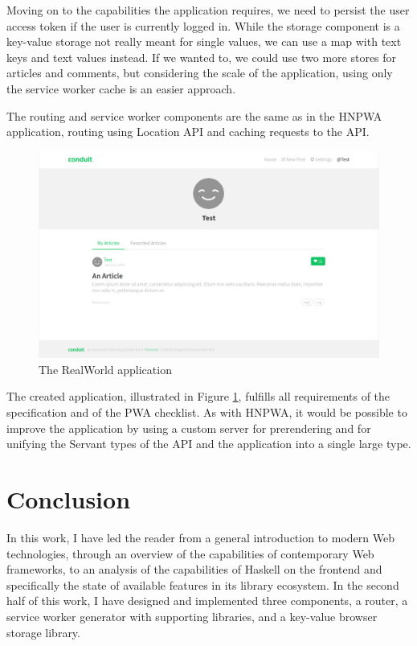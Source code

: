 \documentclass[english,zadani,odsaz]{fitthesis}
\begin{document}
Moving on to the capabilities the application requires, we need to persist the
user access token if the user is currently logged in. While the storage
component is a key-value storage not really meant for single values, we can use
a map with text keys and text values instead. If we wanted to, we could use two
more stores for articles and comments, but considering the scale of the
application, using only the service worker cache is an easier approach.

The routing and service worker components are the same as in the HNPWA
application, routing using Location API and caching requests to the API.

\begin{figure}[p]
\centering
\includegraphics[width=.9\linewidth]{obrazky-figures/screenshot-realworld.png}
\caption{The RealWorld application \label{realworld-app}}
\end{figure}

The created application, illustrated in Figure \ref{realworld-app}, fulfills all
requirements of the specification and of the PWA checklist. As with HNPWA, it
would be possible to improve the application by using a custom server for
prerendering and for unifying the Servant types of the API and the application
into a single large type.

\chapter{Conclusion}
\label{sec:org76fbcfd}
In this work, I have led the reader from a general introduction to modern Web
technologies, through an overview of the capabilities of contemporary Web
frameworks, to an analysis of the capabilities of Haskell on the frontend and
specifically the state of available features in its library ecosystem. In the
second half of this work, I have designed and implemented three components, a
router, a service worker generator with supporting libraries, and a key-value
browser storage library.
\end{document}
